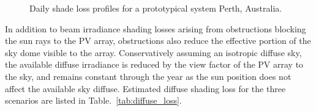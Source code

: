 \documentclass[twocolumn,10pt]{asme2ej}
\begin{document}
\begin{figure}[h!]
\begin{center}
\end{center}
\caption{Daily shade loss profiles for a prototypical system Perth, Australia.}
\label{fig:simple_perth}
\end{figure}


In addition to beam irradiance shading losses arising from obstructions blocking the sun rays to the PV array, obstructions also reduce the effective portion of the sky dome visible to the array.  Conservatively assuming an isotropic diffuse sky, the available diffuse irradiance is reduced by the view factor of the PV array to the sky, and remains constant through the year as the sun position does not affect the available sky diffuse.  Estimated diffuse shading loss for the three scenarios are listed in Table.~\ref{tab:diffuse_loss}.
\end{document}
